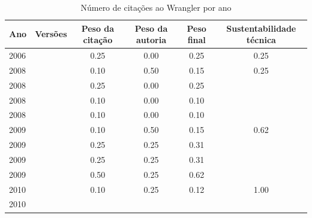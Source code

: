 \begin{table}[H]
\caption{Número de citações ao Wrangler por ano}
\centering
\begin{tabular}{| l | c | c | c | c | c |}
  \hline
  Ano & Versões & Peso da citação & Peso da autoria & Peso final & Sustentabilidade técnica \\
  \hline
            2006
          &
          
          &
          0.25
          &
          0.00
          &
          0.25
          &
            {\color{red} 0.25}
          \\
\hline
            2008
          &
          
          &
          0.10
          &
          0.50
          &
          0.15
          &
            {\color{red} 0.25}
          \\
            2008
          &
          
          &
          0.25
          &
          0.00
          &
          0.25
          &
          \\
            2008
          &
          
          &
          0.10
          &
          0.00
          &
          0.10
          &
          \\
            2008
          &
          
          &
          0.10
          &
          0.00
          &
          0.10
          &
          \\
\hline
            2009
          &
          
          &
          0.10
          &
          0.50
          &
          0.15
          &
            {\color{blue} 0.62}
          \\
            2009
          &
          
          &
          0.25
          &
          0.25
          &
          0.31
          &
          \\
            2009
          &
          
          &
          0.25
          &
          0.25
          &
          0.31
          &
          \\
            2009
          &
          
          &
          0.50
          &
          0.25
          &
          0.62
          &
          \\
\hline
            2010
          &
          
          &
          0.10
          &
          0.25
          &
          0.12
          &
            {\color{blue} 1.00}
          \\
            2010
          &
          

\end{tabular}
\end{table}
